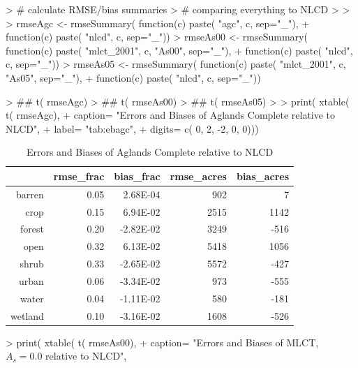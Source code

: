 \begin{Schunk}
\begin{Sinput}
> # calculate RMSE/bias summaries
> # comparing everything to NLCD
> 
> 
> rmseAgc <- rmseSummary( function(c) paste(  "agc", c, sep="_"),
+                         function(c) paste( "nlcd", c, sep="_"))
> rmseAs00 <- rmseSummary( function(c) paste( "mlct_2001", c, "As00", sep="_"),
+                          function(c) paste( "nlcd", c, sep="_"))
> rmseAs05 <- rmseSummary( function(c) paste( "mlct_2001", c, "As05", sep="_"),
+                          function(c) paste( "nlcd", c, sep="_"))
\end{Sinput}
\end{Schunk}

\begin{Schunk}
\begin{Sinput}
> ## t( rmseAgc)
> ## t( rmseAs00)
> ## t( rmseAs05)
> 
> print( xtable( t( rmseAgc), 
+               caption= "Errors and Biases of Aglands Complete relative to NLCD",
+               label= "tab:ebagc",
+               digits= c( 0, 2, -2, 0, 0)))
\end{Sinput}
\begin{table}[ht]
\begin{center}
\begin{tabular}{rrrrr}
  \hline
 & rmse\_frac & bias\_frac & rmse\_acres & bias\_acres \\ 
  \hline
barren & 0.05 & 2.68E-04 & 902 & 7 \\ 
  crop & 0.15 & 6.94E-02 & 2515 & 1142 \\ 
  forest & 0.20 & -2.82E-02 & 3249 & -516 \\ 
  open & 0.32 & 6.13E-02 & 5418 & 1056 \\ 
  shrub & 0.33 & -2.65E-02 & 5572 & -427 \\ 
  urban & 0.06 & -3.34E-02 & 973 & -555 \\ 
  water & 0.04 & -1.11E-02 & 580 & -181 \\ 
  wetland & 0.10 & -3.16E-02 & 1608 & -526 \\ 
   \hline
\end{tabular}
\caption{Errors and Biases of Aglands Complete relative to NLCD}
\label{tab:ebagc}
\end{center}
\end{table}\begin{Sinput}
> print( xtable( t( rmseAs00), 
+               caption= "Errors and Biases of MLCT, $A_s = 0.0$ relative to NLCD",

\end{Sinput}
\end{Schunk}
